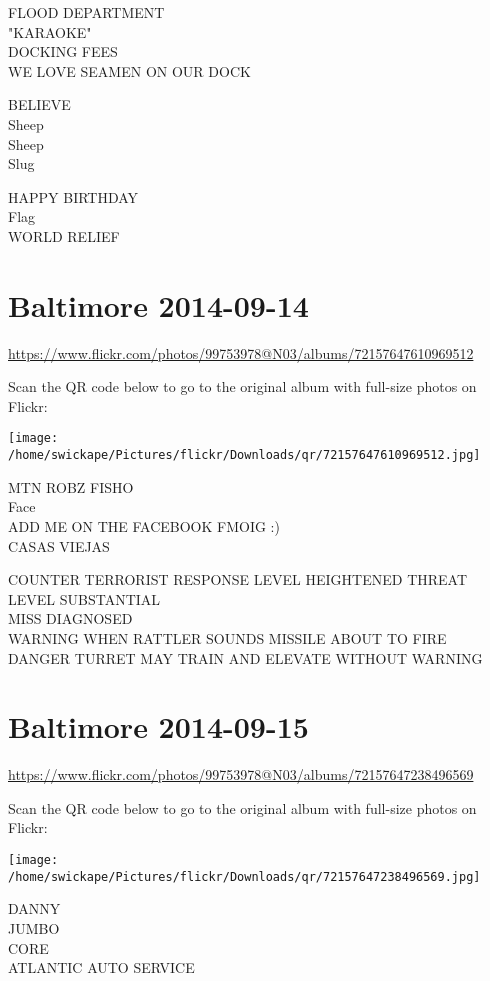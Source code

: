 \documentclass[10pt,letterpaper]{article}
\begin{document}
FLOOD DEPARTMENT\\
"KARAOKE"\\
DOCKING FEES\\
WE LOVE SEAMEN ON OUR DOCK

BELIEVE\\
Sheep\\
Sheep\\
Slug

HAPPY BIRTHDAY\\
Flag\\
WORLD RELIEF


\section*{Baltimore 2014-09-14}

\url{https://www.flickr.com/photos/99753978@N03/albums/72157647610969512}

Scan the QR code below to go to the original album with full-size photos on Flickr:

\texttt{[image: /home/swickape/Pictures/flickr/Downloads/qr/72157647610969512.jpg]}


MTN ROBZ FISHO\\
Face\\
ADD ME ON THE FACEBOOK FMOIG :)\\
CASAS VIEJAS

COUNTER TERRORIST RESPONSE LEVEL HEIGHTENED THREAT LEVEL SUBSTANTIAL\\
MISS DIAGNOSED\\
WARNING WHEN RATTLER SOUNDS MISSILE ABOUT TO FIRE\\
DANGER TURRET MAY TRAIN AND ELEVATE WITHOUT WARNING


\section*{Baltimore 2014-09-15}

\url{https://www.flickr.com/photos/99753978@N03/albums/72157647238496569}

Scan the QR code below to go to the original album with full-size photos on Flickr:

\texttt{[image: /home/swickape/Pictures/flickr/Downloads/qr/72157647238496569.jpg]}


DANNY\\
JUMBO\\
CORE\\
ATLANTIC AUTO SERVICE
\end{document}
